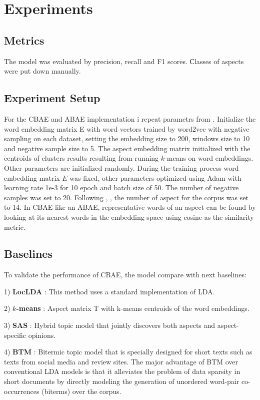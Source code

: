 \documentclass{article}
\begin{document}
\section{Experiments}

\subsection{Metrics}
The model was evaluated by precision, recall and F1 scores. Сlasses of aspects were put down manually.

\subsection{Experiment Setup}
For the CBAE and ABAE implementation i repeat parametrs from \cite{He2018ABAE}.  Initialize the word embedding matrix E with word vectors trained by word2vec with negative sampling on each dataset, setting the embedding size to 200, windows size to 10 and negative sample size to 5. The aspect embedding matrix initialized with the centroids of clusters results resulting from running $k$-means on word embeddings. Other parameters are initialized randomly. During the training process word embedding matrix $E$ was fixed, other parameters optimized using Adam with learning rate 1e-3 for 10 epoch and batch size of 50. The number of negative samples was set to 20. Following \cite{Brody2010UAS}, \cite{Zhao2010JMA}, \cite{He2018ABAE} the number of aspect for the corpus was set to 14. In CBAE like an ABAE, representative  words of an aspect can be found by looking at its nearest words in the embedding space using cosine as the similarity metric.

\subsection{Baselines}
To validate the performance of CBAE, the model compare with next baselines:

1) \textbf{LocLDA} \cite{Brody2010UAS}: This method uses a standard implementation of LDA.

2) \textbf{$k$-means} \cite{He2018ABAE}: Aspect matrix T with k-means centroids of the word embeddings.

3) \textbf{SAS} \cite{Mukherjee2012}: Hybrid topic model that jointly discovers both aspects and aspect-specific opinions.

4) \textbf{BTM} \cite{Yan2013}: Bitermic topic model that is specially designed for short texts such as texts from social media and review sites. The major advantage of BTM over conventional LDA models is that it alleviates the problem of data sparsity in short documents by directly modeling the generation of unordered word-pair co-occurrences (biterms) over the corpus.
\end{document}
